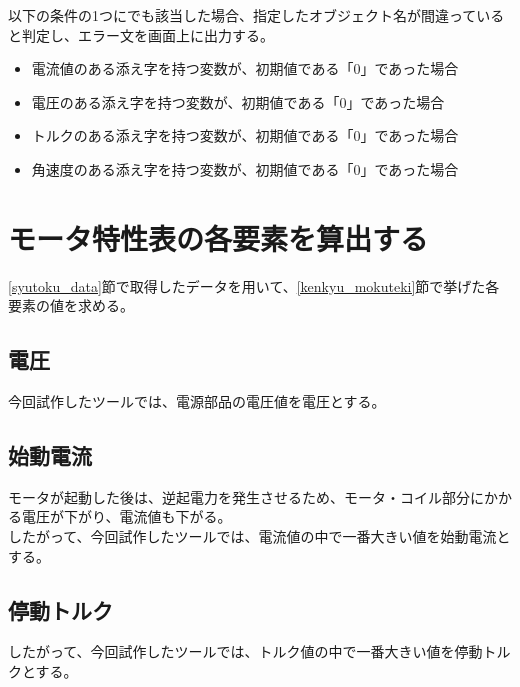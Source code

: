 以下の条件の1つにでも該当した場合、指定したオブジェクト名が間違っていると判定し、エラー文を画面上に出力する。
\begin{itemize}
    \item 電流値のある添え字を持つ変数が、初期値である「0」であった場合
    \item 電圧のある添え字を持つ変数が、初期値である「0」であった場合
    \item トルクのある添え字を持つ変数が、初期値である「0」であった場合
    \item 角速度のある添え字を持つ変数が、初期値である「0」であった場合
\end{itemize}

\section{モータ特性表の各要素を算出する}\label{keisan}
\ref{syutoku_data}節で取得したデータを用いて、\ref{kenkyu_mokuteki}節で挙げた各要素の値を求める。

\subsection{電圧}\label{sub:keisan_dennatu}
今回試作したツールでは、電源部品の電圧値を電圧とする。

\subsection{始動電流}\label{sub:keisan_sidouden}
モータが起動した後は、逆起電力を発生させるため、モータ・コイル部分にかかる電圧が下がり、電流値も下がる。\\
したがって、今回試作したツールでは、電流値の中で一番大きい値を始動電流とする。

\subsection{停動トルク}\label{sub:keisan_teidoutoruku}
したがって、今回試作したツールでは、トルク値の中で一番大きい値を停動トルクとする。

